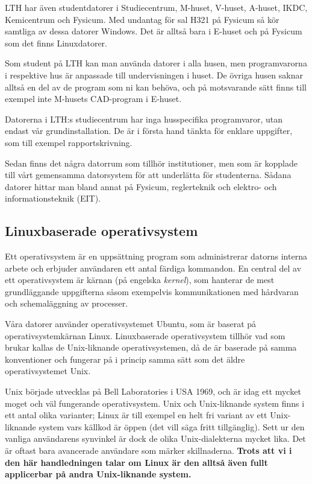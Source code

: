 \documentclass[a4paper,twocolumn]{book}
\begin{document}
LTH har även studentdatorer i Studiecentrum, M-huset, V-huset, A-huset, IKDC,
Kemicentrum och Fysicum. Med undantag för sal H321 på Fysicum
så kör samtliga av dessa datorer Windows. Det är alltså bara i E-huset och
på Fysicum som det finns Linuxdatorer.

Som student på LTH kan man använda datorer i alla husen, men programvarorna i
respektive hus är anpassade till undervisningen i huset. De övriga husen
saknar alltså en del av de program som ni kan behöva, och på motsvarande sätt
finns till exempel inte M-husets CAD-program i E-huset.

Datorerna i LTH:s studiecentrum har inga husspecifika programvaror, utan
endast vår grundinstallation. De är i första hand tänkta för enklare
uppgifter, som till exempel rapportskrivning.

Sedan finns det några datorrum som tillhör institutioner, men som är kopplade
till vårt gemensamma datorsystem för att underlätta för studenterna. Sådana
datorer hittar man bland annat på Fysicum, reglerteknik och elektro- och
informationsteknik (EIT).

\subsection{Linuxbaserade operativsystem}

Ett operativsystem är en uppsättning program som administrerar datorns
interna arbete och erbjuder användaren ett antal färdiga kommandon. En central
del av ett operativsystem är kärnan (på engelska \emph{kernel}), som hanterar
de mest grundläggande uppgifterna såsom exempelvis kommunikationen med hårdvaran
och schemaläggning av processer.

Våra datorer använder operativsystemet Ubuntu, som är baserat på
operativsystemkärnan Linux. Linuxbaserade operativsystem tillhör vad som brukar
kallas de Unix-liknande operativsystemen, då de är baserade på samma konventioner
och fungerar på i princip samma sätt som det äldre operativsystemet Unix.

Unix började utvecklas på Bell Laboratories i USA 1969, och är idag ett
mycket moget och väl fungerande operativsystem. Unix och Unix-liknande system finns
i ett antal olika varianter; Linux är till exempel en helt fri variant av
ett Unix-liknande system vars källkod är öppen (det vill säga fritt tillgänglig).
Sett ur den vanliga användarens synvinkel är
dock de olika Unix-dialekterna mycket lika. Det är oftast bara avancerade
användare som märker skillnaderna. \textbf{Trots att vi i den här handledningen talar
om Linux är den alltså även fullt applicerbar på andra Unix-liknande system.}
\end{document}

